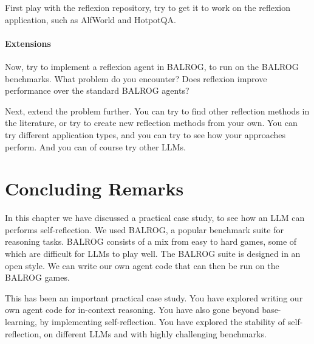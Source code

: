 First play with the reflexion repository, try to get it to work on the reflexion application, such as AlfWorld and HotpotQA. 

\paragraph{Extensions}
Now, try to implement a reflexion agent in BALROG, to run on the BALROG benchmarks.
What problem do you encounter? Does reflexion improve performance over the standard BALROG agents? 

Next,   extend the problem further. You can  try to find other reflection methods in the literature, or try to create new reflection methods from your own. You can try different   application types, and you can try to see how your approaches perform. And you can of course try  other LLMs.

\section{Concluding Remarks}
In this chapter we have discussed a practical case study, to see how an LLM can performs self-reflection. We used BALROG, a popular benchmark suite for reasoning tasks. BALROG consists of a mix from easy to hard games, some of which are difficult for LLMs to play well.
The BALROG suite is designed in an open style. We can write our own agent code that can then be run on the BALROG games. 

This has been an important practical case study. 
You have explored writing our own agent code for in-context reasoning. You have also gone beyond base-learning, by implementing self-reflection. You have explored the stability of self-reflection, on different LLMs and with highly challenging benchmarks.

%





